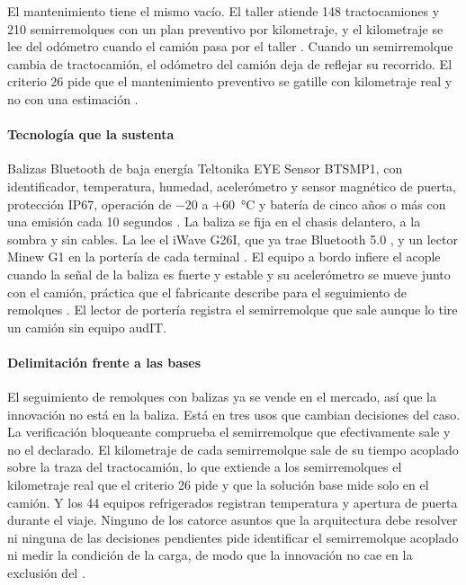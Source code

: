 El mantenimiento tiene el mismo vacío. El taller atiende 148 tractocamiones y 210 semirremolques con
un plan preventivo por kilometraje, y el kilometraje se lee del odómetro cuando el camión pasa por el
taller . Cuando un semirremolque cambia de tractocamión, el odómetro del camión
deja de reflejar su recorrido. El criterio 26 pide que el mantenimiento preventivo se gatille con
kilometraje real y no con una estimación .

\paragraph{Tecnología que la sustenta} Balizas Bluetooth de baja energía Teltonika EYE Sensor BTSMP1,
con identificador, temperatura, humedad, acelerómetro y sensor magnético de puerta, protección IP67,
operación de $-20$ a $+60$~°C y batería de cinco años o más con una emisión cada 10 segundos
\parencite{teltonika_eye}. La baliza se fija en el chasis delantero, a la sombra y sin cables. La lee
el iWave G26I, que ya trae Bluetooth 5.0 \parencite{iwave_g26i}, y un lector Minew G1 en la portería de
cada terminal \parencite{minew_g1}. El equipo a bordo infiere el acople cuando la señal de la baliza es
fuerte y estable y su acelerómetro se mueve junto con el camión, práctica que el fabricante describe
para el seguimiento de remolques \parencite{teltonika_trailer}. El lector de portería registra el
semirremolque que sale aunque lo tire un camión sin equipo audIT.

\paragraph{Delimitación frente a las bases} El seguimiento de remolques con balizas ya se vende en el
mercado, así que la innovación no está en la baliza. Está en tres usos que cambian decisiones del caso.
La verificación bloqueante comprueba el semirremolque que efectivamente sale y no el declarado. El
kilometraje de cada semirremolque sale de su tiempo acoplado sobre la traza del tractocamión, lo que
extiende a los semirremolques el kilometraje real que el criterio 26 pide y que la solución base mide
solo en el camión. Y los 44 equipos refrigerados registran temperatura y apertura de puerta durante el
viaje. Ninguno de los catorce asuntos que la arquitectura debe resolver  ni
ninguna de las decisiones pendientes  pide identificar el semirremolque
acoplado ni medir la condición de la carga, de modo que la innovación no cae en la exclusión del
.

